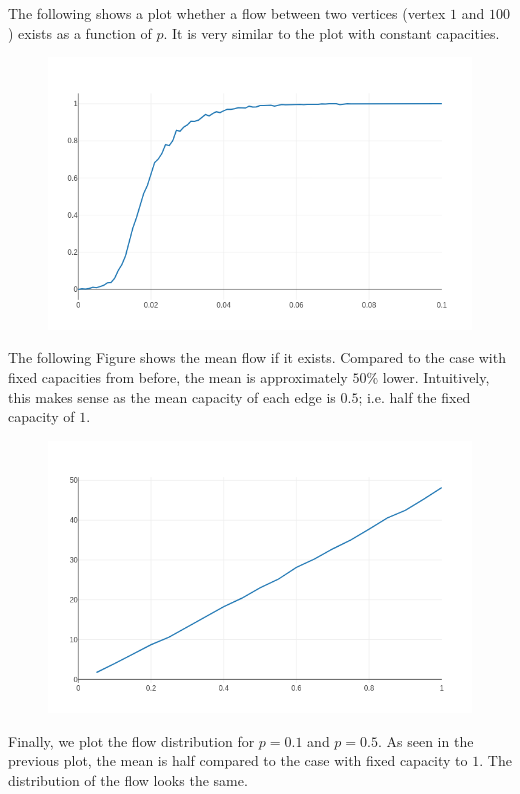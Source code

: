 The following shows a plot whether a flow between two vertices (vertex $1$ and $100$) exists as a function of $p$. It is very similar to the plot with constant capacities.

\begin{figure}[H]
\centering
\includegraphics[scale=0.45]{images/max_flow_04_06.png}
\end{figure}

The following Figure shows the mean flow if it exists. Compared to the case with fixed capacities from before, the mean is approximately $50\%$ lower. Intuitively, this makes sense as the mean capacity of each edge is $0.5$; i.e. half the fixed capacity of $1$.

\begin{figure}[H]
\centering
\includegraphics[scale=0.45]{images/max_flow_04_07.png}
\end{figure}

Finally, we plot the flow distribution for $p=0.1$ and $p=0.5$. As seen in the previous plot, the mean is half compared to the case with fixed capacity to $1$. The distribution of the flow looks the same.

